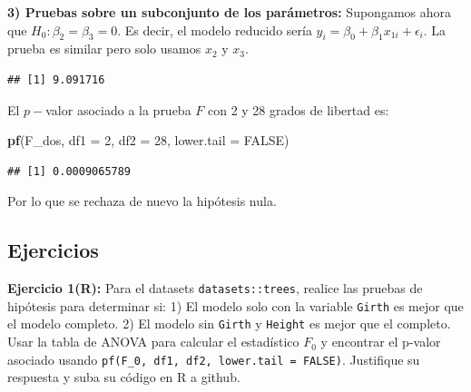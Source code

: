 \documentclass[
]{book}
\newenvironment{Shaded}{\begin{snugshade}}{\end{snugshade}}
\newcommand{\AttributeTok}[1]{\textcolor[rgb]{0.13,0.29,0.53}{#1}}
\newcommand{\ConstantTok}[1]{\textcolor[rgb]{0.56,0.35,0.01}{#1}}
\newcommand{\DecValTok}[1]{\textcolor[rgb]{0.00,0.00,0.81}{#1}}
\newcommand{\FunctionTok}[1]{\textcolor[rgb]{0.13,0.29,0.53}{\textbf{#1}}}
\newcommand{\NormalTok}[1]{#1}
\newcommand{\OtherTok}[1]{\textcolor[rgb]{0.56,0.35,0.01}{#1}}
\newcommand{\SpecialCharTok}[1]{\textcolor[rgb]{0.81,0.36,0.00}{\textbf{#1}}}
\newcommand{\StringTok}[1]{\textcolor[rgb]{0.31,0.60,0.02}{#1}}
\begin{document}
\textbf{3) Pruebas sobre un subconjunto de los parámetros:} Supongamos ahora que \(H_0:\beta_2=\beta_3=0\). Es decir, el modelo reducido sería \(y_i = \beta_0+ \beta_1x_{1i}+\epsilon_i\). La prueba es similar pero solo usamos \(x_2\) y \(x_3\).

\begin{Shaded}
\end{Shaded}

\begin{verbatim}
## [1] 9.091716
\end{verbatim}

El \(p-\)valor asociado a la prueba \(F\) con 2 y 28 grados de libertad es:

\begin{Shaded}
\begin{Highlighting}[]
\FunctionTok{pf}\NormalTok{(F\_dos, }\AttributeTok{df1 =} \DecValTok{2}\NormalTok{, }\AttributeTok{df2 =} \DecValTok{28}\NormalTok{, }\AttributeTok{lower.tail =} \ConstantTok{FALSE}\NormalTok{)}
\end{Highlighting}
\end{Shaded}

\begin{verbatim}
## [1] 0.0009065789
\end{verbatim}

Por lo que se rechaza de nuevo la hipótesis nula.

\subsection{Ejercicios}\label{ejercicios-3}

\textbf{Ejercicio 1(R):} Para el datasets \texttt{datasets::trees}, realice las pruebas de hipótesis para determinar si:
1) El modelo solo con la variable \texttt{Girth} es mejor que el modelo completo.
2) El modelo sin \texttt{Girth} y \texttt{Height} es mejor que el completo.
Usar la tabla de ANOVA para calcular el estadístico \(F_0\) y encontrar el p-valor asociado usando \texttt{pf(F\_0,\ df1,\ df2,\ lower.tail\ =\ FALSE)}. Justifique su respuesta y suba su código en R a github.
\end{document}
